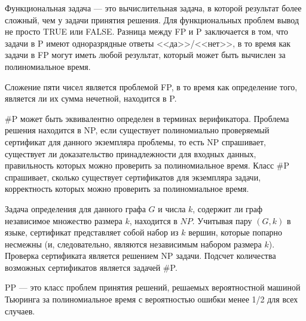     

    \begin{Def}
        Функциональная задача --- это вычислительная задача, в которой результат более сложный, чем у задачи принятия решения. Для функциональных проблем вывод не просто TRUE или FALSE. Разница между FP и P заключается в том, что задачи в P имеют одноразрядные ответы <<да>>/<<нет>>, в то время как задачи в FP могут иметь любой результат, который может быть вычислен за полиномиальное время. 
    \end{Def}
    
    \begin{Example}
        Сложение пяти чисел является проблемой FP, в то время как определение того, является ли их сумма нечетной, находится в P. 
    \end{Example}
    
    \begin{Def}
        \#P может быть эквивалентно определен в терминах верификатора. Проблема решения находится в NP, если существует полиномиально проверяемый сертификат для данного экземпляра проблемы, то есть NP спрашивает, существует ли доказательство принадлежности для входных данных, правильность которых можно проверить за полиномиальное время. Класс \#P спрашивает, сколько существует сертификатов для экземпляра задачи, корректность которых можно проверить за полиномиальное время. 
    \end{Def}
    
    \begin{Example}
        Задача определения для данного графа $G$ и числа $k$, содержит ли граф независимое множество размера $k$, находится в $NP$. Учитывая пару $(G, k)$ в языке, сертификат представляет собой набор из $k$ вершин, которые попарно несмежны (и, следовательно, являются независимым набором размера $k$). Проверка сертификата является решением NP задачи. Подсчет количества возможных сертификатов является задачей \#P.
    \end{Example}
    
    \begin{Def}[Класс PP]
        PP — это класс проблем принятия решений, решаемых вероятностной машиной Тьюринга за полиномиальное время с вероятностью ошибки менее 1/2 для всех случаев. 
    \end{Def}
    
